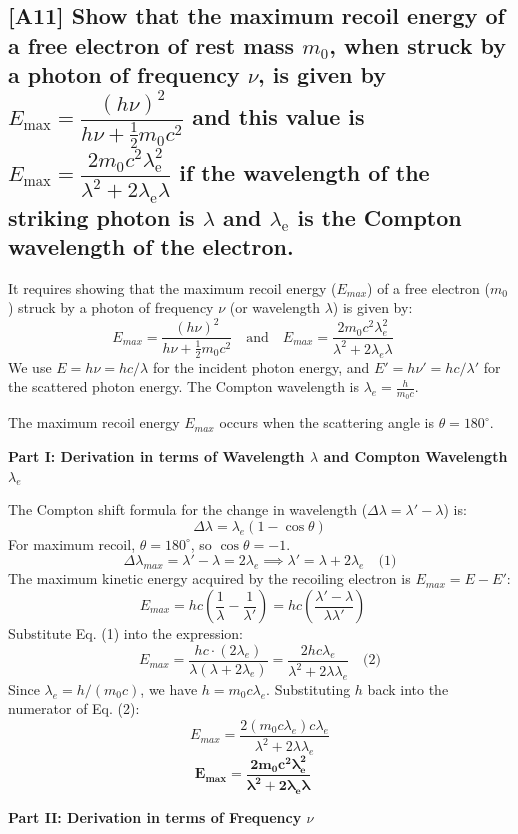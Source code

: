 \documentclass[12pt]{article}
\begin{document}
\subsection{[A11] Show that the maximum recoil energy of a free electron of rest mass $m_0$, when struck by a photon of frequency $\nu$, is given by $E_{\max}=\dfrac{(h\nu)^2}{h\nu+\tfrac12 m_0c^2}$ and this value is $E_{\max}=\dfrac{2m_0c^2\lambda_{\text{e}}^2}{\lambda^2+2\lambda_{\text{e}}\lambda}$ if the wavelength of the striking photon is $\lambda$ and $\lambda_{\text{e}}$ is the Compton wavelength of the electron.}

It requires showing that the maximum recoil energy ($E_{max}$) of a free electron ($m_0$) struck by a photon of frequency $\nu$ (or wavelength $\lambda$) is given by:
$$
E_{max} = \frac{(h\nu)^2}{h\nu+ \frac{1}{2} m_0c^2} \quad \text{and} \quad E_{max} = \frac{2m_0c^2\lambda_e^2}{\lambda^2+2\lambda_e\lambda} \quad \text{}
$$
We use $E = h\nu = hc/\lambda$ for the incident photon energy, and $E' = h\nu' = hc/\lambda'$ for the scattered photon energy. The Compton wavelength is $\lambda_e = \frac{h}{m_0c}$.

The maximum recoil energy $E_{max}$ occurs when the scattering angle is $\theta = 180^\circ$.

\textbf{Part I: Derivation in terms of Wavelength $\lambda$ and Compton Wavelength $\lambda_e$}

The Compton shift formula for the change in wavelength ($\Delta\lambda = \lambda' - \lambda$) is:
$$
\Delta\lambda = \lambda_e (1 - \cos\theta)
$$
For maximum recoil, $\theta = 180^\circ$, so $\cos\theta = -1$.
$$
\Delta\lambda_{max} = \lambda' - \lambda = 2\lambda_e \implies \lambda' = \lambda + 2\lambda_e \quad \text{(1)}
$$
The maximum kinetic energy acquired by the recoiling electron is $E_{max} = E - E'$:
$$
E_{max} = hc \left( \frac{1}{\lambda} - \frac{1}{\lambda'} \right) = hc \left( \frac{\lambda' - \lambda}{\lambda \lambda'} \right) \quad \text{}
$$
Substitute Eq. (1) into the expression:
$$
E_{max} = \frac{hc \cdot (2\lambda_e)}{\lambda (\lambda + 2\lambda_e)} = \frac{2hc\lambda_e}{\lambda^2 + 2\lambda\lambda_e} \quad \text{(2)}
$$
Since $\lambda_e = h/(m_0c)$, we have $h = m_0c\lambda_e$. Substituting $h$ back into the numerator of Eq. (2):
$$
E_{max} = \frac{2 (m_0c\lambda_e) c \lambda_e}{\lambda^2 + 2\lambda\lambda_e}
$$
$$
\mathbf{E_{max} = \frac{2m_0c^2\lambda_e^2}{\lambda^2+2\lambda_e\lambda}} \quad
$$

\textbf{Part II: Derivation in terms of Frequency $\nu$}
\end{document}
